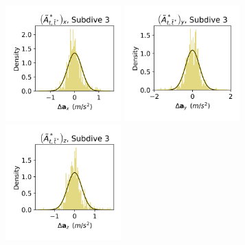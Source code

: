 \documentclass{article}
\begin{document}
\begin{center}
        \includegraphics[width=1.75in]{../Plots/2019/20190902-182840-CATs_OB_1_0_267_CarHMM_empirical_hist_Ax_2.png}
        \includegraphics[width=1.75in]{../Plots/2019/20190902-182840-CATs_OB_1_0_267_CarHMM_empirical_hist_Ay_2.png}
        \includegraphics[width=1.75in]{../Plots/2019/20190902-182840-CATs_OB_1_0_267_CarHMM_empirical_hist_Az_2.png}
        

\end{center}
\end{document}

